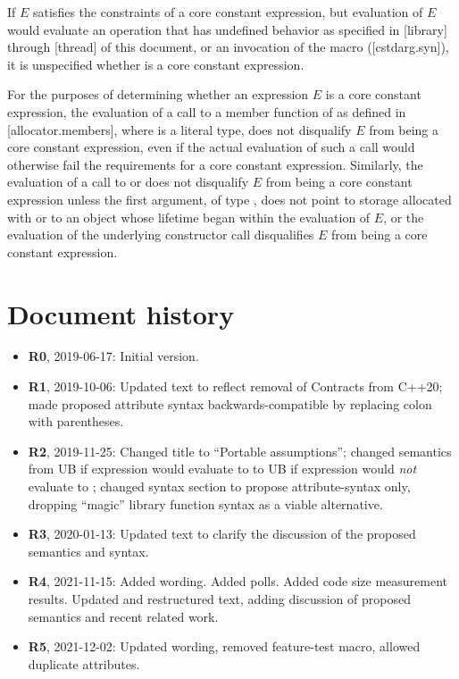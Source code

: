 \begin{adjustwidth}{0.5cm}{0.5cm}
If $E$ satisfies the constraints of a core constant expression, but evaluation of $E$ would evaluate an operation that has undefined behavior as specified in [library] through [thread] of this document, or an invocation of the  macro ([cstdarg.syn]), it is unspecified whether  is a core constant expression.

For the purposes of determining
whether an expression $E$ is a core constant expression,
the evaluation of a call to a member function of 
as defined in [allocator.members], where  is a literal type,
does not disqualify $E$ from being a core constant expression,
even if the actual evaluation of such a call
would otherwise fail the requirements for a core constant expression.
Similarly, the evaluation of a call to
 or 
does not disqualify $E$
from being a core constant expression unless
the first argument, of type , does not point
to storage allocated with  or
to an object whose lifetime began within the evaluation of $E$, or
the evaluation of the underlying constructor call
disqualifies $E$ from being a core constant expression.
\end{adjustwidth}

\section*{Document history}

\begin{itemize}
\item \textbf{R0}, 2019-06-17: Initial version.
\item \textbf{R1}, 2019-10-06: Updated text to reflect removal of Contracts from C++20; made proposed attribute syntax backwards-compatible by replacing colon with parentheses.
\item \textbf{R2}, 2019-11-25: Changed title to ``Portable assumptions''; changed semantics from UB if expression would evaluate to  to UB if expression would \emph{not} evaluate to ; changed syntax section to propose attribute-syntax only, dropping ``magic'' library function syntax as a viable alternative.
\item \textbf {R3}, 2020-01-13: Updated text to clarify the discussion of the proposed semantics and syntax.
\item \textbf{R4}, 2021-11-15:  Added wording. Added polls. Added code size measurement results. Updated and restructured text, adding discussion of proposed semantics and recent related work.
\item \textbf{R5}, 2021-12-02: Updated wording, removed feature-test macro, allowed duplicate attributes.
\end{itemize}


